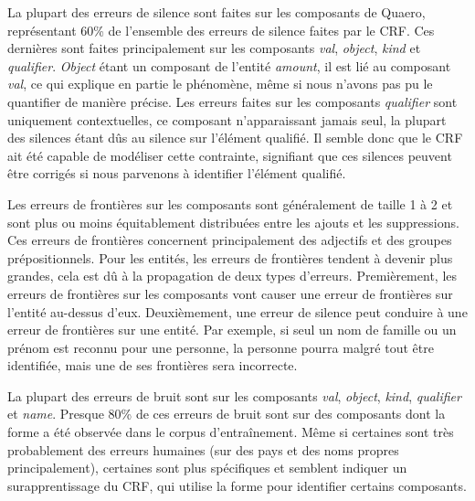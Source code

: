 \documentclass[12pt,a4paper,times,twoside,openright]{report}
\begin{document}
La plupart des erreurs de silence sont faites sur les composants de Quaero, représentant 60\% de l'ensemble des erreurs de silence faites par le CRF. Ces dernières sont faites principalement sur les composants \emph{val}, \emph{object}, \emph{kind} et \emph{qualifier}. \emph{Object} étant un composant de l'entité \emph{amount}, il est lié au composant \emph{val}, ce qui explique en partie le phénomène, même si nous n'avons pas pu le quantifier de manière précise. Les erreurs faites sur les composants \emph{qualifier} sont uniquement contextuelles, ce composant n'apparaissant jamais seul, la plupart des silences étant dûs au silence sur l'élément qualifié. Il semble donc que le CRF ait été capable de modéliser cette contrainte, signifiant que ces silences peuvent être corrigés si nous parvenons à identifier l'élément qualifié.

Les erreurs de frontières sur les composants sont généralement de taille 1 à 2 et sont plus ou moins équitablement distribuées entre les ajouts et les suppressions. Ces erreurs de frontières concernent principalement des adjectifs et des groupes prépositionnels. Pour les entités, les erreurs de frontières tendent à devenir plus grandes, cela est dû à la propagation de deux types d'erreurs. Premièrement, les erreurs de frontières sur les composants vont causer une erreur de frontières sur l'entité au-dessus d'eux. Deuxièmement, une erreur de silence peut conduire à une erreur de frontières sur une entité. Par exemple, si seul un nom de famille ou un prénom est reconnu pour une personne, la personne pourra malgré tout être identifiée, mais une de ses frontières sera incorrecte.

La plupart des erreurs de bruit sont sur les composants \emph{val}, \emph{object}, \emph{kind}, \emph{qualifier} et \emph{name}. Presque 80\% de ces erreurs de bruit sont sur des composants dont la forme a été observée dans le corpus d'entraînement. Même si certaines sont très probablement des erreurs humaines (sur des pays et des noms propres principalement), certaines sont plus spécifiques et semblent indiquer un surapprentissage du CRF, qui utilise la forme pour identifier certains composants.
\end{document}
